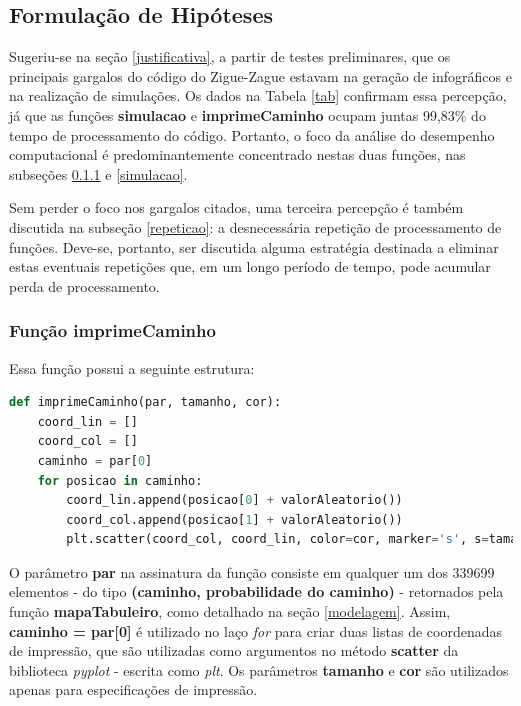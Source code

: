 \documentclass[12pt]{article}
\begin{document}
\subsection{Formulação de Hipóteses}
\label{hipoteses}


Sugeriu-se na seção \ref{justificativa}, a partir de testes preliminares, que os principais gargalos do código do Zigue-Zague estavam na geração de infográficos e na realização de simulações. Os dados na Tabela \ref{tab} confirmam essa percepção, já que as funções \textbf{simulacao} e \textbf{imprimeCaminho} ocupam juntas  99,83\% do tempo de processamento do código. Portanto, o foco da análise do desempenho computacional é predominantemente concentrado nestas duas funções, nas subseções \ref{imprime_caminho} e \ref{simulacao}.

Sem perder o foco nos gargalos citados, uma terceira percepção é também discutida na subseção \ref{repeticao}: a desnecessária repetição de processamento de funções. Deve-se, portanto, ser discutida alguma estratégia destinada a eliminar estas eventuais repetições que, em um longo período de tempo, pode acumular perda de processamento.

\subsubsection{Função \textbf{imprimeCaminho}}
\label{imprime_caminho}

Essa função possui a seguinte estrutura:

\begin{lstlisting}[language=Python]
def imprimeCaminho(par, tamanho, cor):
	coord_lin = []
	coord_col = []
	caminho = par[0]
	for posicao in caminho:
		coord_lin.append(posicao[0] + valorAleatorio())
		coord_col.append(posicao[1] + valorAleatorio())
		plt.scatter(coord_col, coord_lin, color=cor, marker='s', s=tamanho)
\end{lstlisting}

O parâmetro \textbf{par} na assinatura da função consiste em qualquer um dos 339699 elementos - do tipo \textbf{(caminho, probabilidade do caminho)} - retornados pela função \textbf{mapaTabuleiro}, como detalhado na seção \ref{modelagem}. Assim, \textbf{caminho = par[0]} é utilizado no laço \textit{for} para criar duas listas de coordenadas de impressão, que são utilizadas como argumentos no método \textbf{scatter} da biblioteca \textit{pyplot} - escrita como \textit{plt}. Os parâmetros \textbf{tamanho} e \textbf{cor} são utilizados apenas para especificações de impressão.
\end{document}
